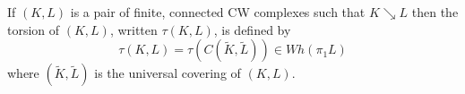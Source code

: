 If $(K, L)$ is a pair of finite, connected CW complexes such that $K \searrow L$ then the torsion of $(K, L)$, written $\tau(K, L)$, is defined by
$$\tau(K, L) = \tau(C(\tilde{K}, \tilde{L})) \in Wh(\pi_1 L)$$
where $(\tilde{K}, \tilde{L})$ is the universal covering of $(K, L)$.
